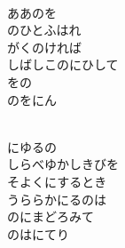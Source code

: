 \documentclass[10pt,b5j]{tarticle} %
\begin{document}
\vspace{1.5em} %
\newcommand{\linespace}{0.5em} %
\newcommand{\blocksize}{0.5\hsize} %
\newcommand{\itemmargin}{3em} %
\begin{enumerate} %
    \setlength{\itemindent}{\itemmargin} %
    \begin{minipage}[c]{\blocksize}
    
        \vspace{\linespace}
        \item~\\
        ああのを\\
        のひとふはれ\\
        がくのければ\\
        しばしこのにひして\\
        をの\\
        のをにん
        
    \end{minipage}
    \begin{minipage}[c]{\blocksize}
        
        \vspace{\linespace}
        \item~\\
        にゆるの\\
        しらべゆかしきびを\\
        そよくにするとき\\
        うららかにるのは\\
        のにまどろみて\\
        のはにてり
        
    \end{minipage}
    \begin{minipage}[c]{\blocksize}
        

\end{minipage}
\end{enumerate}
\end{document}
